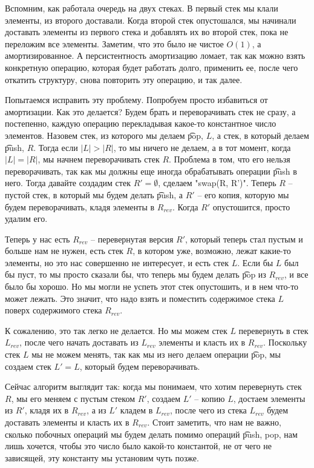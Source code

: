 Вспомним, как работала очередь на двух стеках. 
В первый стек мы клали элементы, из второго доставали. 
Когда второй стек опустошался, мы начинали доставать элементы из первого стека и добавлять их во 
второй стек, пока не переложим все элементы. Заметим, что это было не чистое $O(1)$, а амортизированное.
А персистентность амортизацию ломает, так как можно взять конкретную операцию, которая будет работать долго,
применить ее, после чего откатить структуру, снова повторить эту операцию, и так далее.

Попытаемся исправить эту проблему. 
Попробуем просто избавиться от амортизации. 
Как это делается? 
Будем брать и переворачивать стек не сразу, а постепенно, каждую операцию перекладывая 
какое-то константное число элементов. 
Назовем стек, из которого мы делаем \t{pop}, $L$, а стек, в который делаем \t{push}, $R$. 
Тогда если $|L| > |R|$, то мы ничего не делаем, а в тот момент, когда $|L| = |R|$, мы начнем переворачивать
стек $R$. 
Проблема в том, что его нельзя переворачивать, так как мы должны еще иногда обрабатывать операции
\t{push} в него. 
Тогда давайте создадим стек $R' = \emptyset$, сделаем \cpp"swap(R, R')".
Теперь $R$ -- пустой стек, в который мы будем делать \t{push}, а $R'$ -- его копия, которую мы будем переворачивать, 
кладя элементы в $R_{rev}$. 
Когда $R'$ опустошится, просто удалим его.

Теперь у нас есть $R_{rev}$ -- перевернутая версия $R'$, который теперь стал пустым и больше нам не нужен, есть стек
$R$, в котором уже, возможно, лежат какие-то элементы, но это нас совершенно не интересует, и есть стек $L$.
Если бы $L$ был бы пуст, то мы просто сказали бы, что теперь мы будем делать \t{pop} из $R_{rev}$, и все было бы хорошо.
Но мы могли не успеть этот стек опустошить, и в нем что-то может лежать.
Это значит, что надо взять и поместить содержимое стека $L$ поверх содержимого стека $R_{rev}$.

К сожалению, это так легко не делается. Но мы можем стек $L$ перевернуть в стек $L_{rev}$, после чего начать доставать из
$L_{rev}$ элементы и класть их в $R_{rev}$. 
Поскольку стек $L$ мы не можем менять, так как мы из него делаем операции \t{pop}, мы создаем стек $L' = L$, который будем
переворачивать. 

Сейчас алгоритм выглядит так: когда мы понимаем, что хотим перевернуть стек $R$, мы его меняем с пустым стеком $R'$,
создаем $L'$ -- копию $L$, достаем элементы из $R'$, кладя их в $R_{rev}$, а из $L'$ кладем в $L_{rev}$, после чего из стека
$L_{rev}$ будем доставать элементы и класть их в $R_{rev}$. 
Стоит заметить, что нам не важно, сколько побочных операций мы будем делать помимо операций \t{push, pop}, нам лишь хочется,
чтобы это число было какой-то константой, не от чего не зависящей, эту константу мы установим чуть позже.

